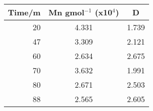 \begin{tabular}[b]{rcc}
\toprule
 Time/m &  Mn gmol$^{-1}$ (x10$^4$) &     D \\
\midrule
     20 &                     4.331 & 1.739 \\
     47 &                     3.309 & 2.121 \\
     60 &                     2.634 & 2.675 \\
     70 &                     3.632 & 1.991 \\
     80 &                     2.671 & 2.503 \\
     88 &                     2.565 & 2.605 \\
\bottomrule
\end{tabular}
